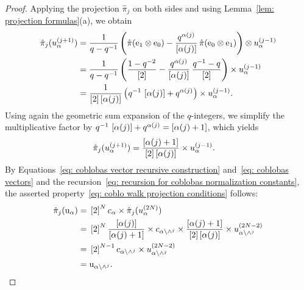 \documentclass[oneside,english]{amsart}
\numberwithin{equation}{section}
\numberwithin{figure}{section}
\theoremstyle{plain}
\theoremstyle{plain}
\theoremstyle{plain}
\theoremstyle{remark}
\theoremstyle{plain}
\theoremstyle{plain}
\theoremstyle{plain}
\theoremstyle{plain}
\theoremstyle{plain}
\theoremstyle{plain}
\theoremstyle{plain}
\theoremstyle{plain}
\begin{document}
\begin{proof}
Applying the projection $\hat{\pi}_j$ on both sides and using
Lemma~\ref{lem: projection formulas}(a), we obtain
\begin{align*}
\hat{\pi}_j ( u_\alpha^{(j+1)} )
= \; & \frac{1}{q-q^{-1}}\left(
\hat{\pi} ( \mathrm{e}_1 \otimes \mathrm{e}_0)
- \frac{q^{\alpha(j)}}{\left[\alpha(j)\right]}\, 
\hat{\pi} ( \mathrm{e}_0 \otimes \mathrm{e}_1) \right) \otimes u_\alpha^{(j-1)} \\
= \; & \frac{1}{q-q^{-1}} \left(
\frac{1-q^{-2}}{\left[2\right]}
- \frac{q^{\alpha(j)}}{\left[\alpha(j)\right]}\,\frac{q^{-1}-q}{\left[2\right]}
\right) \times u_\alpha^{(j-1)} \\
= \; & \frac{1}{\left[2\right] \left[\alpha(j)\right]} 
\left( q^{-1}\,\left[\alpha(j)\right] + q^{\alpha(j)} \right)
\times u_\alpha^{(j-1)}.
\end{align*}
Using again the geometric sum expansion
of the $q$-integers, %
we simplify
the multiplicative factor by
$q^{-1}\,\left[\alpha(j)\right] + q^{\alpha(j)} =  \left[\alpha(j)+1\right]$,
which yields
\begin{align*}
\hat{\pi}_j ( u_\alpha^{(j+1)} )
= \; & \frac{\left[\alpha(j)+1\right]}{\left[2\right] \left[\alpha(j)\right]} \times u_\alpha^{(j-1)} .
\end{align*}
By Equations~\eqref{eq: coblobas vector recursive construction} 
and~\eqref{eq: coblobas vectors} and the %
recursion~\eqref{eq: recursion for coblobas normalization constants}, the 
asserted property~\eqref{eq: coblo walk projection conditions} follows:
\begin{align*}
\hat{\pi}_j ( \mathrm{u}_\alpha ) 
= \; & \left[2\right]^N c_\alpha \times 
\hat{\pi}_j ( u_{\alpha}^{(2N)} ) \\
= \; & \left[2\right]^N \frac{\left[\alpha(j)\right]}{\left[\alpha(j)+1\right]} \times
c_{\alpha\setminus \wedge^j} \times 
\frac{\left[\alpha(j)+1\right]}{\left[2\right] \left[\alpha(j)\right]}
\times u_{\alpha \setminus \wedge^j}^{(2N-2)} \\
= \; & \left[2\right]^{N-1} c_{\alpha\setminus \wedge^j} \times
u_{\alpha \setminus \wedge^j}^{(2N-2)} \\
= \; & \mathrm{u}_{\alpha \setminus \wedge^j}.
\end{align*}


\end{proof}
\end{document}
